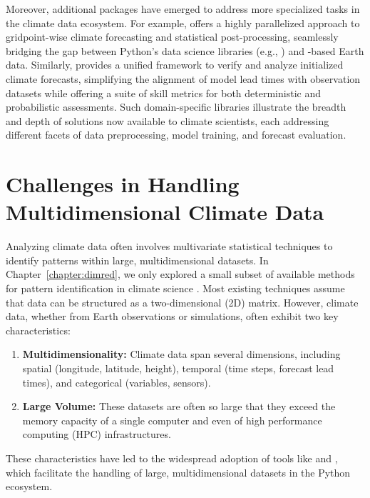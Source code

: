 Moreover, additional packages have emerged to address more specialized tasks in the climate data ecosystem. For example,  \cite{hall_xcast_2022} offers a highly parallelized approach to gridpoint-wise climate forecasting and statistical post-processing, seamlessly bridging the gap between Python's data science libraries (e.g.,  \cite{scikit-learn}) and -based Earth data. Similarly,  \cite{brady_climpred_2021} provides a unified framework to verify and analyze initialized climate forecasts, simplifying the alignment of model lead times with observation datasets while offering a suite of skill metrics for both deterministic and probabilistic assessments. Such domain-specific libraries illustrate the breadth and depth of solutions now available to climate scientists, each addressing different facets of data preprocessing, model training, and forecast evaluation.


\section{Challenges in Handling Multidimensional Climate Data}
\label{sec:xeofs:challenges}
Analyzing climate data often involves multivariate statistical techniques to identify patterns within large, multidimensional datasets. In Chapter~\ref{chapter:dimred}, we only explored a small subset of available methods for pattern identification in climate science \cite[see e.g.][]{hannachi_patterns_2021,hsieh_introduction_2023}. Most existing techniques assume that data can be structured as a two-dimensional (2D) matrix. However, climate data, whether from Earth observations or simulations, often exhibit two key characteristics:

\begin{enumerate}
    \item \textbf{Multidimensionality:} Climate data span several dimensions, including spatial (longitude, latitude, height), temporal (time steps, forecast lead times), and categorical (variables, sensors).
    \item \textbf{Large Volume:} These datasets are often so large that they exceed the memory capacity of a single computer and even of high performance computing (HPC) infrastructures.
\end{enumerate}

These characteristics have led to the widespread adoption of tools like  and , which facilitate the handling of large, multidimensional datasets in the Python ecosystem.

